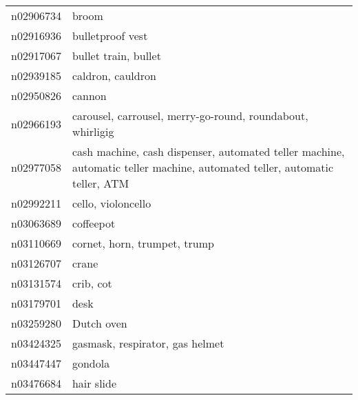 \begin{appendices}
\begin{longtabu}{X|X[4]}
    		n02906734 &                                                                                                                      broom \tabularnewline
    		n02916936 &                                                                                                           bulletproof vest \tabularnewline
    		n02917067 &                                                                                                       bullet train, bullet \tabularnewline
    		n02939185 &                                                                                                          caldron, cauldron \tabularnewline
    		n02950826 &                                                                                                                     cannon \tabularnewline
    		n02966193 &                                                                 carousel, carrousel, merry-go-round, roundabout, whirligig \tabularnewline
    		n02977058 &  cash machine, cash dispenser, automated teller machine, automatic teller machine, automated teller, automatic teller, ATM \tabularnewline
    		n02992211 &                                                                                                         cello, violoncello \tabularnewline
    		n03063689 &                                                                                                                  coffeepot \tabularnewline
    		n03110669 &                                                                                               cornet, horn, trumpet, trump \tabularnewline
    		n03126707 &                                                                                                                      crane \tabularnewline
    		n03131574 &                                                                                                                  crib, cot \tabularnewline
    		n03179701 &                                                                                                                       desk \tabularnewline
    		n03259280 &                                                                                                                 Dutch oven \tabularnewline
    		n03424325 &                                                                                            gasmask, respirator, gas helmet \tabularnewline
    		n03447447 &                                                                                                                    gondola \tabularnewline
    		n03476684 &                                                                                                                 hair slide \tabularnewline

\end{longtabu}
\end{appendices}
